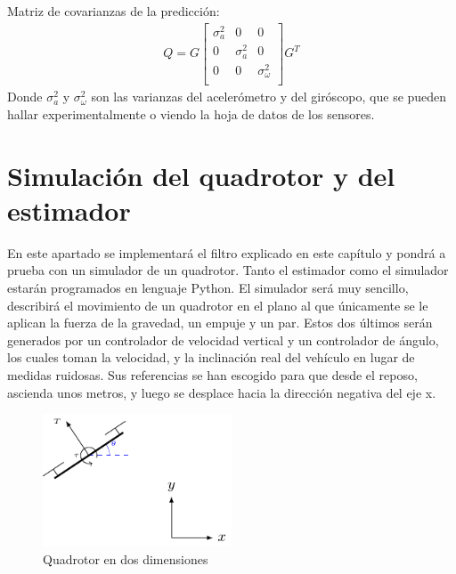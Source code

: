 Matriz de covarianzas de la predicción:
\begin{align}
Q = 
G
\begin{bmatrix} 
\sigma^2_a 	& 0 		& 0\\
0 		& \sigma^2_a 	& 0\\
0 		& 0 		& \sigma^2_\omega\\
\end{bmatrix}
G^T
\end{align}
Donde $\sigma^2_a$ y $\sigma^2_\omega$ son las varianzas del acelerómetro y del giróscopo, que se pueden hallar experimentalmente o viendo la hoja de datos de los sensores. 

\section{Simulación del quadrotor y del estimador}
En este apartado se implementará el filtro explicado en este capítulo y pondrá a prueba con un simulador de un quadrotor. Tanto el estimador como el simulador estarán programados en lenguaje Python. El simulador será muy sencillo, describirá el movimiento de un quadrotor en el plano al que únicamente se le aplican la fuerza de la gravedad, un empuje y un par. Estos dos últimos serán generados por un controlador de velocidad vertical y un controlador de ángulo, los cuales toman la velocidad, y la inclinación real del vehículo en lugar de medidas ruidosas. Sus referencias se han escogido para que desde el reposo, ascienda unos metros, y luego se desplace hacia la dirección negativa del eje x. 


\begin{figure}
\includegraphics[width=0.5\textwidth]{estimador_px4/tikz/quadrotor_2d}
\caption{Quadrotor en dos dimensiones}
\label{fig:model}
\end{figure}

